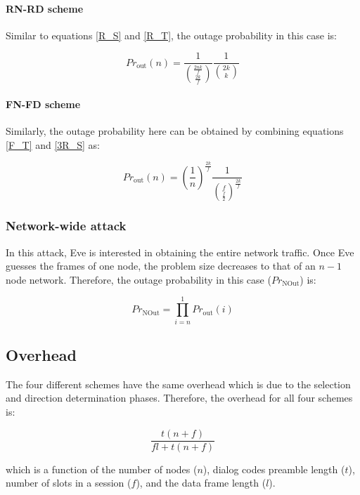 \documentclass[10pt,letterpaper,conference]{IEEEtran}
\begin{document}
\paragraph{\textbf{RN-RD scheme}}

Similar to equations \ref{R_S} and \ref{R_T}, the outage probability in this
case is:

\begin{equation}
Pr_{\textrm{out}}(n)=\left.\frac{1}{\binom{\frac{2nk}{f}}{\frac{2k}{f}}}\right.
{\frac{1}{\binom{2k}{k}}}
\end{equation}

\paragraph{\textbf{FN-FD scheme}}

Similarly, the outage probability here can be obtained by combining equations
\ref{F_T} and \ref{3R_S} as:

\begin{equation}
Pr_{\textrm{out}}(n)=\left.{\left(\frac{1}{n}\right)^{\frac{2k}{f}}}\right.{
\frac{1}{\binom{f}{\frac{f}{2}}^{\frac{2k}{f}}}}
\end{equation}

\subsubsection{Network-wide attack}
In this attack, Eve is interested in obtaining the entire network traffic. Once
Eve guesses the frames of one node, the problem size decreases to that of an $n-1$
node network. Therefore, the outage probability in this case
($Pr_{\textrm{NOut}}$) is:

\begin{equation}
Pr_{\textrm{NOut}} =\prod_{i=n}^{1} Pr_{\textrm{out}}(i)
\end{equation}

\subsection{Overhead}
The four different schemes have the same overhead which is due to the selection
and direction determination phases. Therefore, the overhead for all four schemes is:

\begin{equation}
\frac{t(n+f)}{fl+t(n+f)}
\end{equation}

which is a function of the number of nodes ($n$), dialog codes preamble length ($t$), number of slots in a session
($f$), and the data frame length ($l$).
\end{document}

